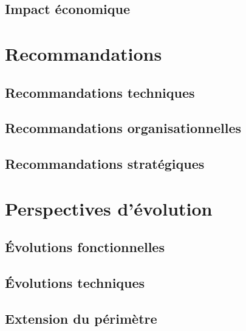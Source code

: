 
\subsection{Impact économique}


\section{Recommandations}


\subsection{Recommandations techniques}


\subsection{Recommandations organisationnelles}


\subsection{Recommandations stratégiques}


\section{Perspectives d'évolution}


\subsection{Évolutions fonctionnelles}


\subsection{Évolutions techniques}


\subsection{Extension du périmètre}


